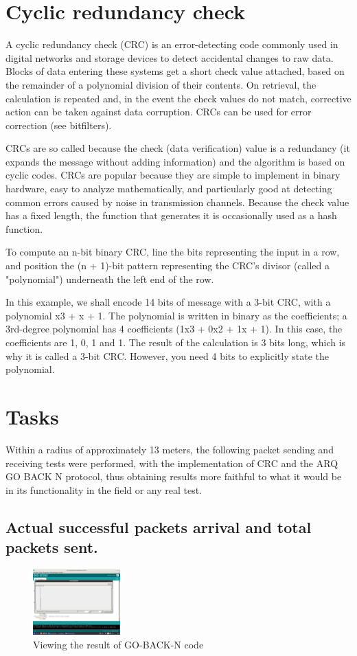 \documentclass[journal,trans]{IEEEtran}
\begin{document}
\section{\textbf{Cyclic redundancy check}}
A cyclic redundancy check (CRC) is an error-detecting code commonly used in digital networks and storage devices to detect accidental changes to raw data. Blocks of data entering these systems get a short check value attached, based on the remainder of a polynomial division of their contents. On retrieval, the calculation is repeated and, in the event the check values do not match, corrective action can be taken against data corruption. CRCs can be used for error correction (see bitfilters).

CRCs are so called because the check (data verification) value is a redundancy (it expands the message without adding information) and the algorithm is based on cyclic codes. CRCs are popular because they are simple to implement in binary hardware, easy to analyze mathematically, and particularly good at detecting common errors caused by noise in transmission channels. Because the check value has a fixed length, the function that generates it is occasionally used as a hash function.

To compute an n-bit binary CRC, line the bits representing the input in a row, and position the (n + 1)-bit pattern representing the CRC's divisor (called a "polynomial") underneath the left end of the row.

In this example, we shall encode 14 bits of message with a 3-bit CRC, with a polynomial x3 + x + 1. The polynomial is written in binary as the coefficients; a 3rd-degree polynomial has 4 coefficients (1x3 + 0x2 + 1x + 1). In this case, the coefficients are 1, 0, 1 and 1. The result of the calculation is 3 bits long, which is why it is called a 3-bit CRC. However, you need 4 bits to explicitly state the polynomial.


\section{\textbf{Tasks}}
Within a radius of approximately 13 meters, the following packet sending and receiving tests were performed, with the implementation of CRC and the ARQ GO BACK N protocol, thus obtaining results more faithful to what it would be in its functionality in the field or any real test.

\subsection{\textbf{Actual successful packets arrival and total packets sent.}}
\begin{figure}[h]
    \includegraphics[width=0.3\textwidth]{ex1.jpeg}
    \centering
    \caption{Viewing the result of GO-BACK-N code}
    \label{fig:my_label5}
\end{figure}
\end{document}
